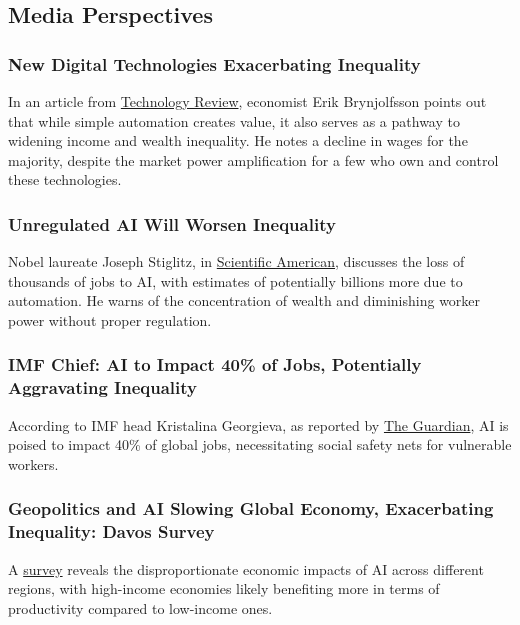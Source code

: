 \documentclass[11pt]{article}
\begin{document}
\subsection{Media Perspectives}


\subsubsection{New Digital Technologies Exacerbating Inequality}
    In an article from \href{https://www.technologyreview.com/2022/04/19/1049378/ai-inequality-problem/}{Technology Review}, economist Erik Brynjolfsson points out that while simple automation creates value, it also serves as a pathway to widening income and wealth inequality. He notes a decline in wages for the majority, despite the market power amplification for a few who own and control these technologies.
    
\subsubsection{Unregulated AI Will Worsen Inequality}
    Nobel laureate Joseph Stiglitz, in \href{https://www.scientificamerican.com/article/unregulated-ai-will-worsen-inequality-warns-nobel-winning-economist-joseph-stiglitz/}{Scientific American}, discusses the loss of thousands of jobs to AI, with estimates of potentially billions more due to automation. He warns of the concentration of wealth and diminishing worker power without proper regulation.
    
\subsubsection{IMF Chief: AI to Impact 40\% of Jobs, Potentially Aggravating Inequality} 
    According to IMF head Kristalina Georgieva, as reported by \href{https://www.theguardian.com/technology/2024/jan/15/ai-jobs-inequality-imf-kristalina-georgieva}{The Guardian}, AI is poised to impact 40\% of global jobs, necessitating social safety nets for vulnerable workers.
    
\subsubsection{Geopolitics and AI Slowing Global Economy, Exacerbating Inequality: Davos Survey}
    A \href{https://www.aljazeera.com/news/2024/1/15/global-economy-8}{survey} reveals the disproportionate economic impacts of AI across different regions, with high-income economies likely benefiting more in terms of productivity compared to low-income ones.
\end{document}
